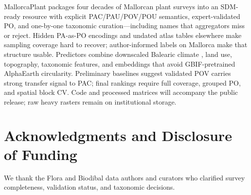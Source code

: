 \documentclass[11pt,letterpaper]{article}
\begin{document}
MallorcaPlant packages four decades of Mallorcan plant surveys into an SDM-ready resource with explicit PAC/PAU/POV/POU semantics, expert-validated PO, and one-by-one taxonomic curation---including names that aggregators miss or reject.
Hidden PA-as-PO encodings and undated atlas tables elsewhere make sampling coverage hard to recover; author-informed labels on Mallorca make that structure usable.
Predictors combine downscaled Balearic climate \citep{bahuet2026}, land use, topography, taxonomic features, and embeddings that avoid GBIF-pretrained AlphaEarth circularity.
Preliminary baselines suggest validated POV carries strong transfer signal to PAC; final rankings require full coverage, grouped PO, and spatial block CV.
Code and processed matrices will accompany the public release; raw heavy rasters remain on institutional storage.


\section*{Acknowledgments and Disclosure of Funding}
We thank the Flora and Biodibal data authors and curators who clarified survey completeness, validation status, and taxonomic decisions.
\end{document}
